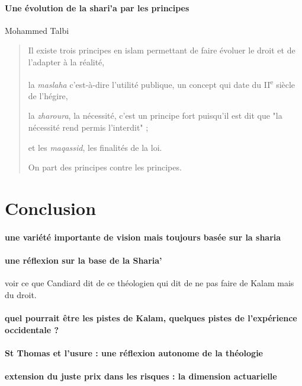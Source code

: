 \paragraph{Une évolution de la shari'a par les principes} Mohammed Talbi 
\begin{quote}
    Il existe
trois principes en islam permettant de faire évoluer le droit et de
l'adapter
à la réalité, 

la \emph{maslaha} c'est-à-dire l'utilité publique, un
concept qui date du II\textsuperscript{e} siècle de l'hégire, 

la
\emph{zharoura}, la nécessité, c'est un principe fort puisqu'il est dit
que "la nécessité rend permis l'interdit" ; 

et les \emph{maqassid}, les
finalités de la loi. 

\begin{Synthesis}
On part des principes contre les principes. 
\end{Synthesis}
\end{quote}


\section{Conclusion}

\paragraph{une variété importante de vision mais toujours basée sur la sharia}

\paragraph{une réflexion sur la base de la Sharia'}
voir ce que Candiard dit de ce théologien qui dit de ne pas faire de Kalam mais du droit.

\paragraph{quel pourrait être les pistes de Kalam, quelques pistes de l'expérience occidentale ?}

\paragraph{St Thomas et l'usure : une réflexion autonome de la théologie}

\paragraph{extension du juste prix dans les risques : la dimension actuarielle}
